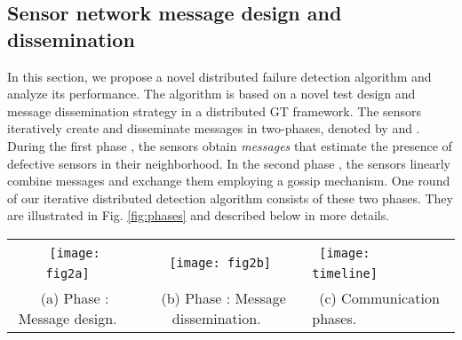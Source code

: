 \documentclass[journal]{IEEEtran}
\begin{document}
\subsection{Sensor network message design and dissemination}\label{ssec:message_dissemin}
In this section, we propose a novel distributed failure detection algorithm and analyze its performance. The algorithm is based on a novel test design and message dissemination strategy in a distributed GT framework. The sensors iteratively create and disseminate messages in two-phases, denoted by  and . During the first phase , the sensors obtain \textit{messages} that estimate the presence of defective sensors in their neighborhood. In the second phase , the sensors linearly combine messages and exchange them employing a gossip mechanism. One round of our iterative distributed detection algorithm consists of these two phases. They are illustrated in Fig. \ref{fig:phases} and described below in more details.
\begin{figure*}[t!]
\begin{center}
\begin{tabular}{ccl}
~\texttt{[image: fig2a]}~&
~\texttt{[image: fig2b]}~&
~\texttt{[image: timeline]}~\\
~(a) Phase : Message design.~&~(b) Phase : Message dissemination.~&~(c) Communication phases.~\\
\end{tabular}
\end{center}
\caption{
Illustration of the message design and dissemination through the sensor network. 
(a) Message formation based on local sensor measurements: Full and dashed arrows correspond to the steps of the message design, respectively. In the first step, the master sensor collects the sensor measurements from its neighbor sensors  and forms the message . In the second step, the message is propagated from the master sensor to its neighbor sensors.
(b) Message dissemination based on a gossip algorithm with pull protocol, where the sensors request the messages from their neighbors chosen uniformly at random. (c) Rounds of communication in our iterative detection algorithm consist of the message design () and the message dissemination () phases.
}
\label{fig:phases}
\end{figure*}
\end{document}
